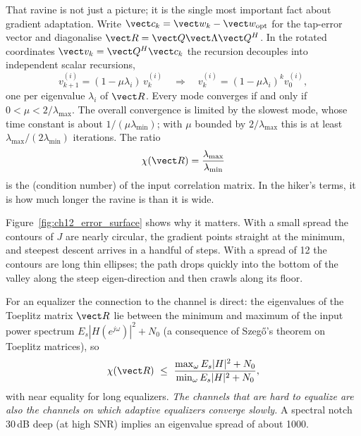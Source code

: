 That ravine is not just a picture; it is the single most important fact about gradient
adaptation. Write $\vect c_k=\vect w_k-\vect w_{\mathrm{opt}}$ for the tap-error vector and
diagonalise $\vect R=\vect Q\vect\Lambda\vect Q^H$. In the rotated coordinates $\vect v_k=\vect
Q^H\vect c_k$ the recursion decouples into independent scalar recursions,
\begin{equation}
v_{k+1}^{(i)}=(1-\mu\lambda_i)\,v_k^{(i)}\quad\Longrightarrow\quad v_k^{(i)}=(1-\mu\lambda_i)^k v_0^{(i)} ,
\end{equation}
one per eigenvalue $\lambda_i$ of $\vect R$. Every mode converges if and only if
$0<\mu<2/\lambda_{\max}$. The overall convergence is limited by the slowest mode, whose time
constant is about $1/(\mu\lambda_{\min})$; with $\mu$ bounded by $2/\lambda_{\max}$ this is at
least $\lambda_{\max}/(2\lambda_{\min})$ iterations. The ratio
\begin{equation}
\chi(\vect R)=\frac{\lambda_{\max}}{\lambda_{\min}}
\end{equation}
is the  (condition number) of the input correlation matrix. In the hiker's
terms, it is how much longer the ravine is than it is wide.

Figure~\ref{fig:ch12_error_surface} shows why it matters. With a small spread the contours of $J$
are nearly circular, the gradient points straight at the minimum, and steepest descent arrives in a
handful of steps. With a spread of 12 the contours are long thin ellipses; the path drops quickly
into the bottom of the valley along the steep eigen-direction and then crawls along its floor.

For an equalizer the connection to the channel is direct: the eigenvalues of the Toeplitz matrix
$\vect R$ lie between the minimum and maximum of the input power spectrum
$E_s|H(e^{j\omega})|^2+N_0$ (a consequence of Szeg\H{o}'s theorem on Toeplitz matrices), so
\begin{equation}
\chi(\vect R)\ \le\ \frac{\max_\omega E_s|H|^2+N_0}{\min_\omega E_s|H|^2+N_0},
\end{equation}
with near equality for long equalizers. \emph{The channels that are hard to equalize are also the
channels on which adaptive equalizers converge slowly.} A spectral notch 30\,dB deep (at high SNR)
implies an eigenvalue spread of about 1000.



